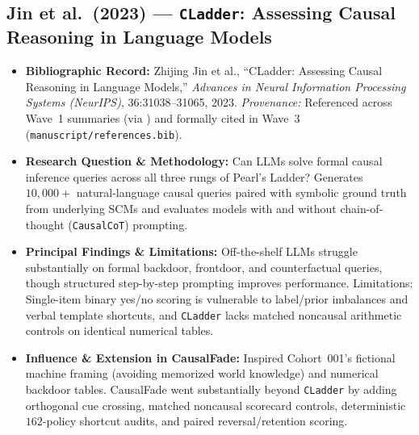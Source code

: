 \subsection{Jin et al.\ (2023) --- \texttt{CLadder}: Assessing Causal Reasoning in Language Models \citep{jin2023cladder}}
\begin{itemize}
  \item \textbf{Bibliographic Record:} Zhijing Jin et al., ``CLadder: Assessing Causal Reasoning in Language Models,'' \emph{Advances in Neural Information Processing Systems (NeurIPS)}, 36:31038--31065, 2023. \emph{Provenance:} Referenced across Wave~1 summaries (via \citealt{nwaiwu2025compressed,yu2025causaleval}) and formally cited in Wave~3 (\texttt{manuscript/references.bib}).
  \item \textbf{Research Question \& Methodology:} Can LLMs solve formal causal inference queries across all three rungs of Pearl's Ladder? Generates $10{,}000+$ natural-language causal queries paired with symbolic ground truth from underlying SCMs and evaluates models with and without chain-of-thought (\texttt{CausalCoT}) prompting.
  \item \textbf{Principal Findings \& Limitations:} Off-the-shelf LLMs struggle substantially on formal backdoor, frontdoor, and counterfactual queries, though structured step-by-step prompting improves performance. Limitations: Single-item binary yes/no scoring is vulnerable to label/prior imbalances and verbal template shortcuts, and \texttt{CLadder} lacks matched noncausal arithmetic controls on identical numerical tables.
  \item \textbf{Influence \& Extension in CausalFade:} Inspired Cohort~001's fictional machine framing (avoiding memorized world knowledge) and numerical backdoor tables. CausalFade went substantially beyond \texttt{CLadder} by adding orthogonal cue crossing, matched noncausal scorecard controls, deterministic $162$-policy shortcut audits, and paired reversal/retention scoring.
\end{itemize}

